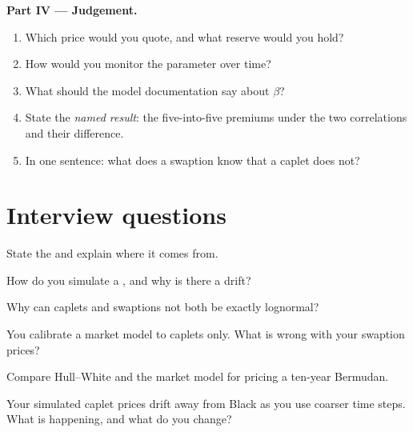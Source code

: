 \begin{problem}
\medskip\noindent\textbf{Part IV --- Judgement.}
\begin{enumerate}[resume]
\item Which price would you quote, and what reserve would you hold?
\item How would you monitor the parameter over time?
\item What should the model documentation say about $\beta$?
\item State the \emph{named result}: the five-into-five premiums under the two
correlations and their difference.
\item In one sentence: what does a swaption know that a caplet does not?
\end{enumerate}
\end{problem}

\section{Interview questions}

\begin{interviewq}\label{iq:rc:forward-rate-and-market-models:1}
State the  and explain where it comes from.
\end{interviewq}

\begin{interviewq}\label{iq:rc:forward-rate-and-market-models:2}
How do you simulate a , and why is there a drift?
\end{interviewq}

\begin{interviewq}\label{iq:rc:forward-rate-and-market-models:3}
Why can caplets and swaptions not both be exactly lognormal?
\end{interviewq}

\begin{interviewq}\label{iq:rc:forward-rate-and-market-models:4}
You calibrate a market model to caplets only. What is wrong with your swaption
prices?
\end{interviewq}

\begin{interviewq}\label{iq:rc:forward-rate-and-market-models:5}
Compare Hull--White and the market model for pricing a ten-year Bermudan.
\end{interviewq}

\begin{interviewq}\label{iq:rc:forward-rate-and-market-models:6}
Your simulated caplet prices drift away from Black as you use coarser time
steps. What is happening, and what do you change?
\end{interviewq}

